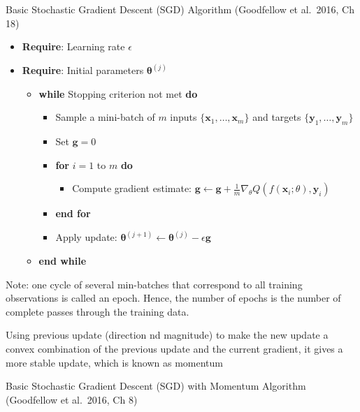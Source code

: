 \documentclass[
]{book}
\providecommand{\tightlist}{%
  \setlength{\itemsep}{0pt}\setlength{\parskip}{0pt}}
\begin{document}
Basic Stochastic Gradient Descent (SGD) Algorithm (Goodfellow et al.~2016, Ch 18)

\begin{itemize}
\item
  \textbf{Require}: Learning rate \(\epsilon\)
\item
  \textbf{Require}: Initial parameters \(\mathbf{\theta}^{(j)}\)

  \begin{itemize}
  \item
    \textbf{while} Stopping criterion not met \textbf{do}

    \begin{itemize}
    \item
      Sample a mini-batch of \(m\) inputs \(\{ \mathbf{x}_1, \dots, \mathbf{x}_m \}\) and targets \(\{ \mathbf{y}_1, \dots, \mathbf{y}_m \}\)
    \item
      Set \(\mathbf{g} = 0\)
    \item
      \textbf{for} \(i = 1\) to \(m\) \textbf{do}

      \begin{itemize}
      \tightlist
      \item
        Compute gradient estimate: \(\mathbf{g} \leftarrow \mathbf{g} + \frac{1}{m} \nabla_\theta Q(f(\mathbf{x}_i; \theta), \mathbf{y}_i)\)
      \end{itemize}
    \item
      \textbf{end for}
    \item
      Apply update: \(\mathbf{\theta}^{(j +1)} \leftarrow \mathbf{\theta}^{(j)} - \epsilon \mathbf{g}\)
    \end{itemize}
  \item
    \textbf{end while}
  \end{itemize}
\end{itemize}

Note: one cycle of several min-batches that correspond to all training observations is called an epoch. Hence, the number of epochs is the number of complete passes through the training data.

Using previous update (direction nd magnitude) to make the new update a convex combination of the previous update and the current gradient, it gives a more stable update, which is known as momentum

Basic Stochastic Gradient Descent (SGD) with Momentum Algorithm (Goodfellow et al.~2016, Ch 8)
\end{document}
